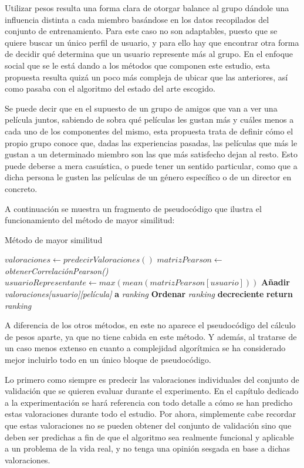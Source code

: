 Utilizar pesos resulta una forma clara de otorgar balance al grupo dándole una influencia distinta a cada miembro basándose en los datos recopilados del conjunto de entrenamiento. Para este caso no son adaptables, puesto que se quiere buscar un único perfil de usuario, y para ello hay que encontrar otra forma de decidir qué determina que un usuario represente más al grupo. En el enfoque social que se le está dando a los métodos que componen este estudio, esta propuesta resulta quizá un poco más compleja de ubicar que las anteriores, así como pasaba con el algoritmo del estado del arte escogido.

Se puede decir que en el supuesto de un grupo de amigos que van a ver una película juntos, sabiendo de sobra qué películas les gustan más y cuáles menos a cada uno de los componentes del mismo, esta propuesta trata de definir cómo el propio grupo conoce que, dadas las experiencias pasadas, las películas que más le gustan a un determinado miembro son las que más satisfecho dejan al resto. Esto puede deberse a mera casuística, o puede tener un sentido particular, como que a dicha persona le gusten las películas de un género específico o de un director en concreto.

A continuación se muestra un fragmento de pseudocódigo que ilustra el funcionamiento del método de mayor similitud:

\begin{algorithm}
	\caption{Método de mayor similitud}
	\begin{algorithmic}[1]
		\State $valoraciones \gets predecirValoraciones()$
		\State $matrizPearson \gets $ \textit{obtenerCorrelaciónPearson()}
		\State $usuarioRepresentante \gets max(mean(matrizPearson[usuario]))$
		\State \textbf{Añadir} \textit{valoraciones[usuario][película]} \textbf{a} \textit{ranking}
		\EndFor
		\State \textbf{Ordenar} \textit{ranking} \textbf{decreciente}
		\State \textbf{return} \textit{ranking}
	\end{algorithmic}
\end{algorithm}

A diferencia de los otros métodos, en este no aparece el pseudocódigo del cálculo de pesos aparte, ya que no tiene cabida en este método. Y además, al tratarse de un caso menos extenso en cuanto a complejidad algorítmica se ha considerado mejor incluirlo todo en un único bloque de pseudocódigo.

Lo primero como siempre es predecir las valoraciones individuales del conjunto de validación que se quieren evaluar durante el experimento. En el capítulo dedicado a la experimentación se hará referencia con todo detalle a cómo se han predicho estas valoraciones durante todo el estudio. Por ahora, simplemente cabe recordar que estas valoraciones no se pueden obtener del conjunto de validación sino que deben ser predichas a fin de que el algoritmo sea realmente funcional y aplicable a un problema de la vida real, y no tenga una opinión sesgada en base a dichas valoraciones.

